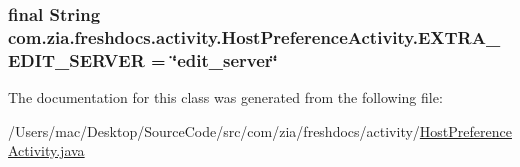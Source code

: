 \hypertarget{classcom_1_1zia_1_1freshdocs_1_1activity_1_1_host_preference_activity_ac1fff866f45e7541484f8f17a62cdad1}{
\subsubsection[{E\-X\-T\-R\-A\-\_\-\-E\-D\-I\-T\-\_\-\-S\-E\-R\-V\-E\-R}]{\setlength{\rightskip}{0pt plus 5cm}final String com.\-zia.\-freshdocs.\-activity.\-Host\-Preference\-Activity.\-E\-X\-T\-R\-A\-\_\-\-E\-D\-I\-T\-\_\-\-S\-E\-R\-V\-E\-R = \char`\"{}edit\-\_\-server\char`\"{}\hspace{0.3cm}{\ttfamily [static]}}}\label{classcom_1_1zia_1_1freshdocs_1_1activity_1_1_host_preference_activity_ac1fff866f45e7541484f8f17a62cdad1}


The documentation for this class was generated from the following file\-:\begin{DoxyCompactItemize}
\item 
/\-Users/mac/\-Desktop/\-Source\-Code/src/com/zia/freshdocs/activity/\hyperlink{_host_preference_activity_8java}{Host\-Preference\-Activity.\-java}\end{DoxyCompactItemize}
